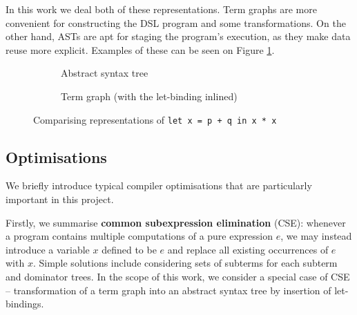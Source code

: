 In this work we deal both of these representations. Term graphs are more convenient for constructing the DSL program and some transformations. On the other hand, ASTs are apt for staging the program's execution, as they make data reuse more explicit. Examples of these can be seen on Figure \ref{fig:term-repr}.

\begin{figure}[ht]
\centering
\begin{subfigure}{.4\textwidth}
  \centering
{}
  \caption{Abstract syntax tree}
\end{subfigure}%
\begin{subfigure}{.4\textwidth}
  \centering
{}
  \caption{Term graph (with the let-binding inlined)}
\end{subfigure}
\caption{Comparising representations of \texttt{let x = p + q in x * x}}
\label{fig:term-repr}
\end{figure}


\subsection{Optimisations} \label{general-optimisations}

We briefly introduce typical compiler optimisations that are particularly important in this project.

Firstly, we summarise \textbf{common subexpression elimination} (CSE): whenever a program contains multiple computations of a pure expression $e$, we may instead introduce a variable $x$ defined to be $e$ and replace all existing occurrences of $e$ with $x$. Simple solutions include considering sets of subterms for each subterm and dominator trees. In the scope of this work, we consider a special case of CSE -- transformation of a term graph into an abstract syntax tree by insertion of let-bindings.

